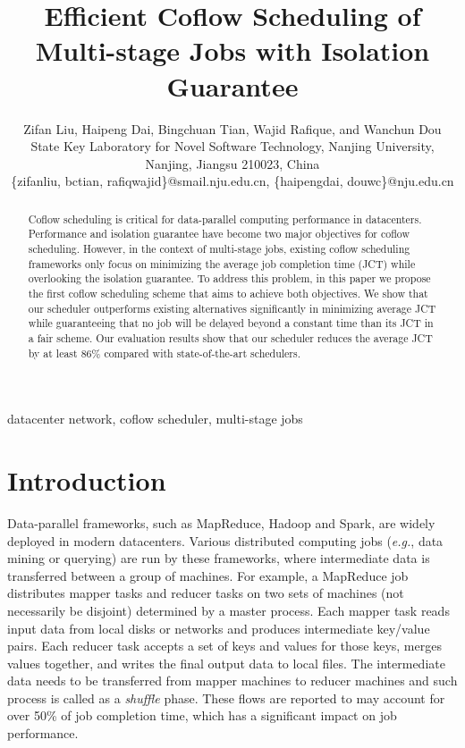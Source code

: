 \documentclass[10pt, conference, letterpaper]{IEEEtran}
\begin{document}
\title{Efficient Coflow Scheduling of Multi-stage Jobs with Isolation Guarantee}

\author{Zifan Liu, Haipeng Dai, Bingchuan Tian, Wajid Rafique, and Wanchun Dou\\
State Key Laboratory for Novel Software Technology, Nanjing University, Nanjing, Jiangsu 210023, China\\
\{zifanliu, bctian, rafiqwajid\}@smail.nju.edu.cn, \{haipengdai, douwc\}@nju.edu.cn}

\maketitle

\begin{abstract}
Coflow scheduling is critical for data-parallel computing performance in datacenters. Performance and isolation guarantee have become two major objectives for coflow scheduling. However, in the context of multi-stage jobs, existing coflow scheduling frameworks only focus on minimizing the average job completion time (JCT) while overlooking the isolation guarantee. To address this problem, in this paper we propose the first coflow scheduling scheme that %
aims to achieve both objectives.
%
We show that our scheduler outperforms existing alternatives significantly in minimizing average JCT while guaranteeing that no job will be delayed beyond a constant time than its JCT in a fair scheme. Our evaluation results show that our scheduler reduces the average JCT by at least 86\% compared with state-of-the-art schedulers.
\end{abstract}

\begin{IEEEkeywords}
datacenter network, coflow scheduler, multi-stage jobs
\end{IEEEkeywords}

\section{Introduction}
Data-parallel frameworks, such as MapReduce\cite{MapReduce}, Hadoop\cite{Hadoop} and Spark\cite{Spark}, are widely deployed in modern datacenters. Various distributed computing jobs (\emph{e.g.}, data mining or querying) are run by these frameworks, where intermediate data is transferred between a group of machines. For example, a MapReduce job distributes mapper tasks and reducer tasks on two sets of machines (not necessarily be disjoint) determined by a master process. Each mapper task reads input data from local disks or networks and produces intermediate key/value pairs. Each reducer task accepts a set of keys and values for those keys, merges values together, and writes the final output data to local files. The intermediate data needs to be transferred from mapper machines to reducer machines and such process is called as a \emph{shuffle} phase. These flows are reported to may account for over 50\% of job completion time, which has a significant impact on job performance.
\end{document}
